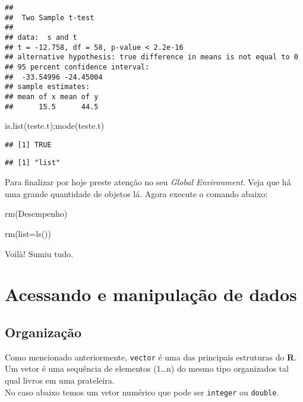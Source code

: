 \documentclass[
]{book}
\newenvironment{Shaded}{\begin{snugshade}}{\end{snugshade}}
\newcommand{\AttributeTok}[1]{\textcolor[rgb]{0.77,0.63,0.00}{#1}}
\newcommand{\FunctionTok}[1]{\textcolor[rgb]{0.00,0.00,0.00}{#1}}
\newcommand{\NormalTok}[1]{#1}
\begin{document}
\begin{verbatim}
## 
##  Two Sample t-test
## 
## data:  s and t
## t = -12.758, df = 58, p-value < 2.2e-16
## alternative hypothesis: true difference in means is not equal to 0
## 95 percent confidence interval:
##  -33.54996 -24.45004
## sample estimates:
## mean of x mean of y 
##      15.5      44.5
\end{verbatim}

\begin{Shaded}
\begin{Highlighting}[]
\FunctionTok{is.list}\NormalTok{(teste.t);}\FunctionTok{mode}\NormalTok{(teste.t)}
\end{Highlighting}
\end{Shaded}

\begin{verbatim}
## [1] TRUE
\end{verbatim}

\begin{verbatim}
## [1] "list"
\end{verbatim}

Para finalizar por hoje preste atenção no seu \emph{Global Environment}.
Veja que há uma grande quantidade de objetos lá. Agora execute o comando abaixo:

\begin{Shaded}
\begin{Highlighting}[]
\FunctionTok{rm}\NormalTok{(Desempenho)}

\FunctionTok{rm}\NormalTok{(}\AttributeTok{list=}\FunctionTok{ls}\NormalTok{())}
\end{Highlighting}
\end{Shaded}

Voilà! Sumiu tudo.

\hypertarget{acessando-e-manipulauxe7uxe3o-de-dados}{%
\chapter{Acessando e manipulação de dados}\label{acessando-e-manipulauxe7uxe3o-de-dados}}

\hypertarget{organizauxe7uxe3o}{%
\section{Organização}\label{organizauxe7uxe3o}}

Como mencionado anteriormente, \texttt{vector} é uma das principais estruturas do \textbf{R}. Um vetor é uma sequência de elementos (1\ldots n) do mesmo tipo organizados tal qual livros em uma prateleira.\\
No caso abaixo temos um vetor numérico que pode ser \texttt{integer} ou \texttt{double}.
\end{document}
